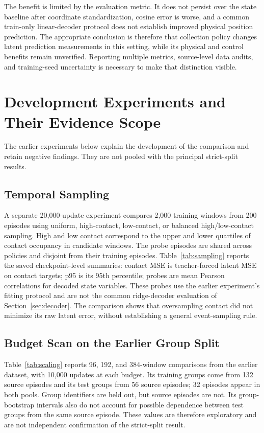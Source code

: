 The benefit is limited by the evaluation metric. It does not persist over the state baseline after coordinate standardization, cosine error is worse, and a common train-only linear-decoder protocol does not establish improved physical position prediction. The appropriate conclusion is therefore that collection policy changes latent prediction measurements in this setting, while its physical and control benefits remain unverified. Reporting multiple metrics, source-level data audits, and training-seed uncertainty is necessary to make that distinction visible.

\appendices
\section{Development Experiments and Their Evidence Scope}
\label{app:development}
The earlier experiments below explain the development of the comparison and retain negative findings. They are not pooled with the principal strict-split results.

\subsection{Temporal Sampling}
A separate 20,000-update experiment compares 2,000 training windows from 200 episodes using uniform, high-contact, low-contact, or balanced high/low-contact sampling. High and low contact correspond to the upper and lower quartiles of contact occupancy in candidate windows. The probe episodes are shared across policies and disjoint from their training episodes. Table~\ref{tab:sampling} reports the saved checkpoint-level summaries: contact MSE is teacher-forced latent MSE on contact targets; p95 is its 95th percentile; probes are mean Pearson correlations for decoded state variables. These probes use the earlier experiment's fitting protocol and are not the common ridge-decoder evaluation of Section~\ref{sec:decoder}. The comparison shows that oversampling contact did not minimize its raw latent error, without establishing a general event-sampling rule.


\subsection{Budget Scan on the Earlier Group Split}
Table~\ref{tab:scaling} reports 96, 192, and 384-window comparisons from the earlier dataset, with 10,000 updates at each budget. Its training groups come from 132 source episodes and its test groups from 56 source episodes; 32 episodes appear in both pools. Group identifiers are held out, but source episodes are not. Its group-bootstrap intervals also do not account for possible dependence between test groups from the same source episode. These values are therefore exploratory and are not independent confirmation of the strict-split result.

